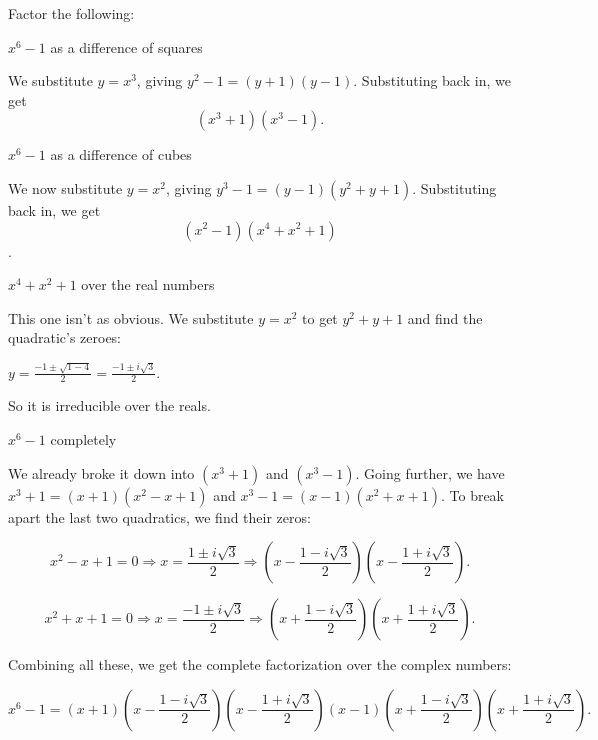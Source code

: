 \documentclass[../gatm_answers.tex]{subfiles}
\begin{document}
\begin{outer_problem}
\item Factor the following:
\end{outer_problem}

\begin{inner_problem}[start=1]
\item $x^6-1$ as a difference of squares
\end{inner_problem}

We substitute $y=x^3$, giving $y^2-1=(y+1)(y-1)$. Substituting back in, we get $$(x^3+1)(x^3-1).$$

\begin{inner_problem}
\item $x^6-1$ as a difference of cubes
\end{inner_problem}

We now substitute $y=x^2$, giving $y^3-1 = (y-1)(y^2+y+1)$. Substituting back in, we get $$(x^2-1)(x^4+x^2+1)$$.

\begin{inner_problem}
\item $x^4+x^2+1$ over the real numbers
\end{inner_problem}

This one isn't as obvious. We substitute $y=x^2$ to get $y^2+y+1$ and find the quadratic's zeroes:

$y=\frac{-1\pm \sqrt{1 - 4}}{2} = \frac{-1\pm i\sqrt{3}}{2}.$

So it is irreducible over the reals.

\begin{inner_problem}
\item $x^6-1$ completely
\end{inner_problem}

We already broke it down into $(x^3+1)$ and $(x^3-1)$. Going further, we have $x^3+1 = (x+1)(x^2-x+1)$ and $x^3-1=(x-1)(x^2+x+1)$. To break apart the last two quadratics, we find their zeros:

$$x^2-x+1=0 \Longrightarrow x = \frac{1 \pm i\sqrt{3}}{2} \Longrightarrow \left(x - \frac{1 - i\sqrt{3}}{2}\right) \left(x - \frac{1 + i\sqrt{3}}{2}\right).$$

$$x^2+x+1=0 \Longrightarrow x = \frac{-1 \pm i\sqrt{3}}{2} \Longrightarrow \left(x + \frac{1 - i\sqrt{3}}{2}\right) \left(x + \frac{1 + i\sqrt{3}}{2}\right).$$

Combining all these, we get the complete factorization over the complex numbers:

$$x^6-1 = (x+1)\left(x - \frac{1 - i\sqrt{3}}{2}\right) \left(x - \frac{1 + i\sqrt{3}}{2}\right)(x-1)\left(x + \frac{1 - i\sqrt{3}}{2}\right) \left(x + \frac{1 + i\sqrt{3}}{2}\right).$$
\end{document}
